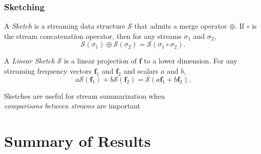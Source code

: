 \documentclass{beamer}
\begin{document}
\begin{frame}
\frametitle{Sketching}

\begin{definition}[Sketch]
A \emph{Sketch} is a streaming data structure $\mathcal{S}$ that admits a merge operator $\oplus$. 
If $\circ$ is the stream concatenation operator, then for any streams $\sigma_1$ and $\sigma_2$,
\begin{equation*}
	\mathcal{S}(\sigma_1) \oplus \mathcal{S}(\sigma_2) = \mathcal{S}(\sigma_1 \circ \sigma_2).
\end{equation*}
\end{definition}

\begin{definition}
A \emph{Linear Sketch} $\mathcal{S}$ is a linear projection of $\mathbf{f}$ to a lower dimension.
For any streaming frequency vectors $\mathbf{f}_1$ and $\mathbf{f}_2$ and scalars $a$ and $b$, 
\begin{equation*}
	a\mathcal{S}(\mathbf{f}_1) + b\mathcal{S}(\mathbf{f}_2) = \mathcal{S}(a\mathbf{f}_1 + b\mathbf{f}_2).
\end{equation*}
\end{definition}

\begin{block}{}
\begin{center}
	Sketches are useful for stream summarization when \\
	\emph{comparisons between streams} are important
\end{center}
\end{block}

\end{frame}

\section{Summary of Results}

\end{document}
